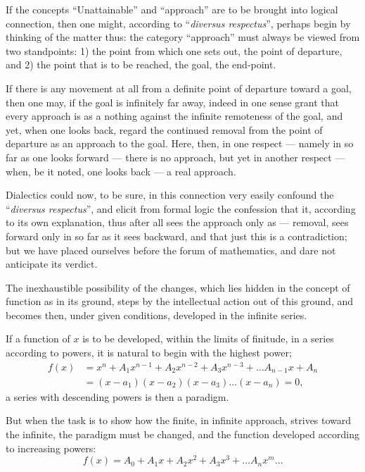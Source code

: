 \documentclass[12pt]{book}
\begin{document}
If the concepts ``Unattainable'' and ``approach'' are to be brought into logical
connection, then one might, according to ``\textit{diversus respectus}'', perhaps
begin by thinking of the matter thus: the category ``approach'' must always be
viewed from two standpoints: 1) the point from which one sets out, the point of
departure, and 2) the point that is to be reached, the goal, the end-point.

If there is any movement at all from a definite point of departure toward a goal,
then one may, if the goal is infinitely far away, indeed in one sense grant that
every approach is as a nothing against the infinite remoteness of the goal, and
yet, when one looks back, regard the continued removal from the point of departure
as an approach to the goal. Here, then, in one respect --- namely in so far as one
looks forward --- there is no approach, but yet in another respect --- when, be it
noted, one looks back --- a real approach.

Dialectics could now, to be sure, in this connection very easily confound the
``\textit{diversus respectus}'', and elicit from
formal logic the confession that it, according to its own explanation, thus after
all sees the approach only as --- removal, sees forward only in so far as it sees
backward, and that just this is a contradiction; but we have placed ourselves
before the forum of mathematics, and dare not anticipate its verdict.

The inexhaustible possibility of the changes, which lies hidden in the concept of
function as in its ground, steps by the intellectual action out of this ground, and
becomes then, under given conditions, developed in the infinite series.

If a function of $x$ is to be developed, within the limits of finitude, in a series
according to powers, it is natural to begin with the highest power;
\[
\begin{aligned}
f(x) &= x^{n} + A_1 x^{n-1} + A_2 x^{n-2} + A_3 x^{n-3} + \dots A_{n-1}x + A_n\\
&= (x-a_1)(x-a_2)(x-a_3)\dots(x-a_n) = 0,
\end{aligned}
\]
a series with descending powers is then a paradigm.

But when the task is to show how the finite, in infinite approach, strives toward
the infinite, the paradigm must be changed, and the function developed according to
increasing powers:
\[
f(x) = A_0 + A_1 x + A_2 x^{2} + A_3 x^{3} + \dots A_n x^{m} \dots
\]
\end{document}
